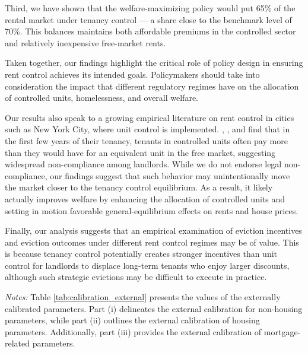 \documentclass[parskip=full]{article}
\newenvironment{fignote2}[1]
{
\par
\medskip
\begin{minipage}{#1}
\footnotesize
}
{
\end{minipage}
}
\begin{document}
Third, we have shown that the welfare-maximizing policy would put 65\% of the rental market under tenancy control — a share close to the benchmark level of 70\%. This balances maintains both affordable premiums in the controlled sector and relatively inexpensive free-market rents.

Taken together, our findings highlight the critical role of policy design in ensuring rent control achieves its intended goals. Policymakers should take into consideration the impact that different regulatory regimes have on the allocation of controlled units, homelessness, and overall welfare.

Our results also speak to a growing empirical literature on rent control in cities such as New York City, where unit control is implemented. \citet{nagy-1997}, \citet{early-2000}, and \citet{cjq-2023} find that in the first few years of their tenancy, tenants in controlled units often pay more than they would have for an equivalent unit in the free market, suggesting widespread non-compliance among landlords. While we do not endorse legal non-compliance, our findings suggest that such behavior may unintentionally move the market closer to the tenancy control equilibrium. As a result, it likely actually improves welfare by enhancing the allocation of controlled units and setting in motion favorable general-equilibrium effects on rents and house prices.

Finally, our analysis suggests that an empirical examination of eviction incentives and eviction outcomes under different rent control regimes may be of value. This is because tenancy control potentially creates stronger incentives than unit control for landlords to displace long-term tenants who enjoy larger discounts, although such strategic evictions may be difficult to execute in practice.




\vspace{1cm}

\begin{table}[H]
    \centering
    \caption{Externally assigned parameter values}
    \vspace{-1.25cm}
    \label{tab:calibration_external}
    
    \vspace{-0.5cm}
    \begin{fignote2}{1.11\textwidth}
    \textit{Notes:} Table \ref{tab:calibration_external} presents the values of the externally calibrated parameters. Part (i) delineates the external calibration for non-housing parameters, while part (ii) outlines the external calibration of housing parameters. Additionally, part (iii) provides the external calibration of mortgage-related parameters.
    \end{fignote2}
\end{table}
\end{document}
